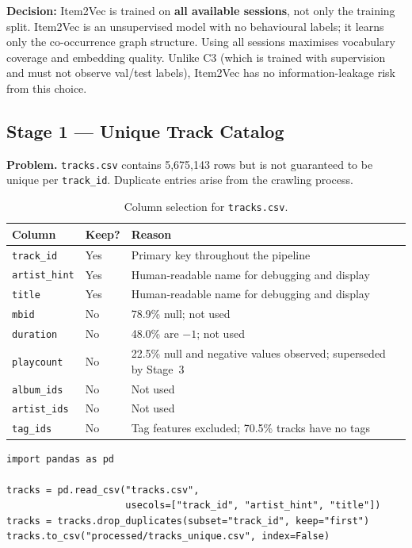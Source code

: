 \documentclass[11pt]{article}
\newcommand{\decision}[1]{\textcolor{decisionblue}{\textbf{Decision:} #1}}
\begin{document}
\decision{Item2Vec is trained on \textbf{all available sessions}, not only
the training split. Item2Vec is an unsupervised model with no behavioural
labels; it learns only the co-occurrence graph structure. Using all sessions
maximises vocabulary coverage and embedding quality. Unlike C3 (which is trained
with supervision and must not observe val/test labels), Item2Vec has no
information-leakage risk from this choice.}

\subsection{Stage 1 --- Unique Track Catalog}

\textbf{Problem.}
\texttt{tracks.csv} contains 5,675,143 rows but is not guaranteed to be
unique per \texttt{track\_id}. Duplicate entries arise from the crawling process.

\begin{table}[H]
\centering
\caption{Column selection for \texttt{tracks.csv}.}
\begin{tabular}{lll}
\toprule
\textbf{Column} & \textbf{Keep?} & \textbf{Reason} \\
\midrule
\texttt{track\_id}    & Yes & Primary key throughout the pipeline \\
\texttt{artist\_hint} & Yes & Human-readable name for debugging and display \\
\texttt{title}        & Yes & Human-readable name for debugging and display \\
\texttt{mbid}         & No  & 78.9\% null; not used \\
\texttt{duration}     & No  & 48.0\% are $-1$; not used \\
\texttt{playcount}    & No  & 22.5\% null and negative values observed; superseded by Stage~3 \\
\texttt{album\_ids}   & No  & Not used \\
\texttt{artist\_ids}  & No  & Not used \\
\texttt{tag\_ids}     & No  & Tag features excluded; 70.5\% tracks have no tags \\
\bottomrule
\end{tabular}
\end{table}

\begin{lstlisting}
import pandas as pd

tracks = pd.read_csv("tracks.csv",
                     usecols=["track_id", "artist_hint", "title"])
tracks = tracks.drop_duplicates(subset="track_id", keep="first")
tracks.to_csv("processed/tracks_unique.csv", index=False)
\end{lstlisting}
\end{document}
